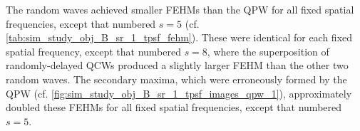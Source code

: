 The random waves achieved
smaller \acp{FEHM} than
the \ac{QPW} for
all fixed spatial frequencies, except
that numbered
$s = 5$
(cf. \cref{tab:sim_study_obj_B_sr_1_tpsf_fehm}).
These were identical for
each fixed spatial frequency, except
that numbered
$s = 8$, where
the superposition of
randomly-delayed \acp{QCW} produced
a slightly larger \ac{FEHM} than
the other two random waves.
The secondary maxima, which were
erroneously formed by
the \ac{QPW}
(cf. \cref{fig:sim_study_obj_B_sr_1_tpsf_images_qpw_1}), approximately doubled
these \acp{FEHM} for
all fixed spatial frequencies, except
that numbered
$s = 5$.
